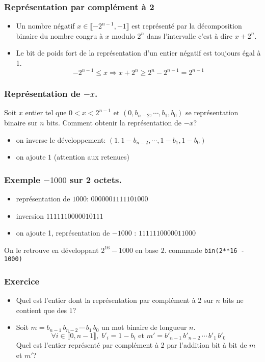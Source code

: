\begin{frame}
  \frametitle{Représentation par complément à 2}
\begin{itemize}
  \item Un nombre négatif $x\in \llbracket -2^{n-1}, -1 \rrbracket$ est représenté par la décomposition binaire du nombre congru à $x$ modulo $2^{n}$ dans l'intervalle c'est à dire $x + 2^n$.
  \item Le bit de poids fort de la représentation d'un entier négatif est toujours égal à 1. 
\begin{displaymath}
  -2^{n-1} \leq x \Rightarrow x + 2^n \geq 2^n - 2^{n-1} = 2^{n-1}
\end{displaymath}

\end{itemize}
\end{frame}

\begin{frame}
  \frametitle{Représentation de $-x$.}
Soit $x$ entier tel que $0<x<2^{n-1}$ et $(0,b_{n-2},\cdots,b_1,b_0)$ se représentation binaire sur $n$ bits.\newline
Comment obtenir la représentation de $-x$? 
\begin{itemize}
  \item on inverse le développement: $(1,1-b_{n-2},\cdots,1-b_1,1-b_0)$
  \item on ajoute $1$ (attention aux retenues)
\end{itemize}
\end{frame}

\begin{frame}
  \frametitle{Exemple $-1000$ sur 2 octets.}
\begin{itemize}
  \item représentation de $1000$: $0000001111101000$
  \item inversion $1111110000010111$
  \item on ajoute 1, représentation de $-1000$ : $1111110000011000$ 
\end{itemize}
On le retrouve en développant $2^{16}-1000$ en base $2$.\newline
commande \texttt{bin(2**16 - 1000)}  
\end{frame}

\begin{frame}
  \frametitle{Exercice}
\begin{itemize}
  \item Quel est l'entier dont la représentation par complément à 2 sur $n$ bits ne contient que des $1$?
  \item Soit $m = b_{n-1}\,b_{n-2}\,\cdots\,b_1\,b_0$ un mot binaire de longueur $n$.
\begin{displaymath}
  \forall i\in \llbracket 0,n-1\rrbracket, \; b'_i = 1-b_i \text{ et } m' = b'_{n-1}\,b'_{n-2}\,\cdots\,b'_1\,b'_0
\end{displaymath}
  Quel est l'entier représenté par complément à 2 par l'addition bit à bit de $m$ et $m'$? 
\end{itemize}
\end{frame}


